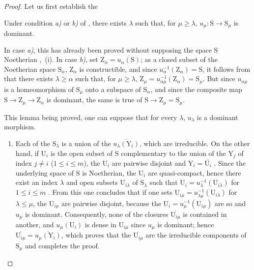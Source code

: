 \begin{proof}
Let us first establish the

\begin{lemma}[8.4.2.1]
\label{IV.8.4.2.1}
Under condition \emph{a)} or \emph{b)} of , there exists $\lambda$ such that, for $\mu\geqslant\lambda$, $u_\mu:\mathrm{S}\to\mathrm{S}_\mu$ is dominant.
\end{lemma}

In case \emph{a)}, this has already been proved without supposing the space $\mathrm{S}$ Noetherian ,~(i).
In case \emph{b)}, set $\mathrm{Z}_\alpha=\overline{u_\alpha(\mathrm{S})}$; as a closed subset of the Noetherian space $\mathrm{S}_\alpha$, $\mathrm{Z}_\alpha$ is constructible, and since $u_\alpha^{-1}(\mathrm{Z}_\alpha)=\mathrm{S}$, it follows from  that there exists $\lambda\geqslant\alpha$ such that, for $\mu\geqslant\lambda$, $\mathrm{Z}_\mu=u_{\alpha\mu}^{-1}(\mathrm{Z}_\alpha)=\mathrm{S}_\mu$.
But since $u_{\alpha\mu}$ is a homeomorphism of $\mathrm{S}_\mu$ onto a subspace of $\mathrm{S}_\alpha$, and since the composite map $\mathrm{S}\to\mathrm{Z}_\mu\to\mathrm{Z}_\alpha$ is dominant, the same is true of $\mathrm{S}\to\mathrm{Z}_\mu=\mathrm{S}_\mu$.

This lemma being proved, one can suppose that for every $\lambda$, $u_\lambda$ is a dominant morphism.
\begin{enumerate}[label=(\roman*)]
  \item Each of the $\mathrm{S}_\lambda$ is a union of the $\overline{u_\lambda(\mathrm{Y}_i)}$, which are irreducible.
On the other hand, if $\mathrm{U}_i$ is the open subset of $\mathrm{S}$ complementary to the union of the $\mathrm{Y}_j$ of index $j\neq i$ ($1\leqslant i\leqslant m$), the $\mathrm{U}_i$ are pairwise disjoint and $\mathrm{Y}_i=\overline{\mathrm{U}_i}$ .
Since the underlying space of $\mathrm{S}$ is Noetherian, the $\mathrm{U}_i$ are quasi-compact, hence there exist an index $\lambda$ and open subsets $\mathrm{U}_{i\lambda}$ of $\mathrm{S}_\lambda$ such that $\mathrm{U}_i=u_\lambda^{-1}(\mathrm{U}_{i\lambda})$ for $1\leqslant i\leqslant m$ .
From this one concludes that if one sets $\mathrm{U}_{i\mu}=u_{\lambda\mu}^{-1}(\mathrm{U}_{i\lambda})$ for $\lambda\leqslant\mu$, the $\mathrm{U}_{i\mu}$ are pairwise disjoint, because the $\mathrm{U}_i=u_\mu^{-1}(\mathrm{U}_{i\mu})$ are so and $u_\mu$ is dominant.
Consequently, none of the closures $\overline{\mathrm{U}_{i\mu}}$ is contained in another, and $u_\mu(\mathrm{U}_i)$ is dense in $\mathrm{U}_{i\mu}$ since $u_\mu$ is dominant; hence $\overline{\mathrm{U}_{i\mu}}=\overline{u_\mu(\mathrm{Y}_i)}$, which proves that the $\overline{\mathrm{U}_{i\mu}}$ are the irreducible components of $\mathrm{S}_\mu$  and completes the proof.


\end{enumerate}
\end{proof}
